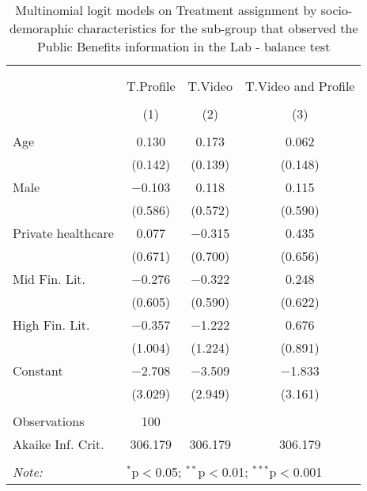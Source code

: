 
\begin{table}[H] \centering 
  \caption{Multinomial logit models on Treatment assignment by socio-demoraphic characteristics for the sub-group that observed the Public Benefits information in the Lab - balance test} 
  \label{tbl:balance_public_lab} 
\begin{tabular}{@{\extracolsep{5pt}}lccc} 
\\[-1.8ex]\hline 
\hline \\[-1.8ex] 
\\[-1.8ex] & T.Profile & T.Video & T.Video and Profile \\ 
\\[-1.8ex] & (1) & (2) & (3)\\ 
\hline \\[-1.8ex] 
 Age & 0.130 & 0.173 & 0.062 \\ 
  & (0.142) & (0.139) & (0.148) \\ 
  Male & $-$0.103 & 0.118 & 0.115 \\ 
  & (0.586) & (0.572) & (0.590) \\ 
  Private healthcare & 0.077 & $-$0.315 & 0.435 \\ 
  & (0.671) & (0.700) & (0.656) \\ 
  Mid Fin. Lit. & $-$0.276 & $-$0.322 & 0.248 \\ 
  & (0.605) & (0.590) & (0.622) \\ 
  High Fin. Lit. & $-$0.357 & $-$1.222 & 0.676 \\ 
  & (1.004) & (1.224) & (0.891) \\ 
  Constant & $-$2.708 & $-$3.509 & $-$1.833 \\ 
  & (3.029) & (2.949) & (3.161) \\ 
 \hline \\[-1.8ex] 
Observations & 100 &  &  \\ 
Akaike Inf. Crit. & 306.179 & 306.179 & 306.179 \\ 
\hline 
\hline \\[-1.8ex] 
\textit{Note:}  & \multicolumn{3}{l}{$^{*}$p$<$0.05; $^{**}$p$<$0.01; $^{***}$p$<$0.001} \\ 
\end{tabular} 
\end{table} 
